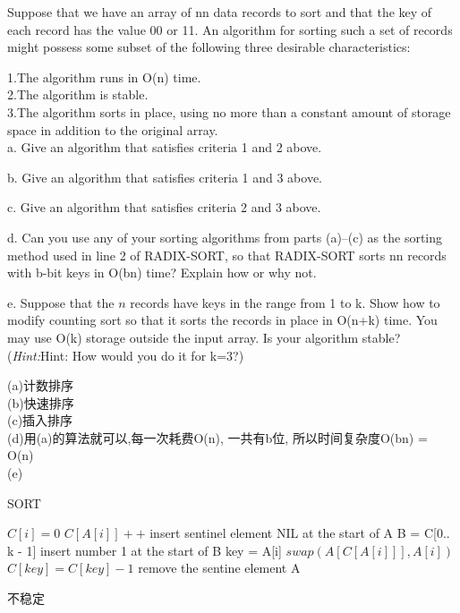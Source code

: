 \documentclass[a4paper, justified]{tufte-handout}
\begin{document}
\begin{problem}[TC Problem 8-2]
Suppose that we have an array of nn data records to sort and that the key of each record has the value 00 or 11. An algorithm for sorting such a set of records might possess some subset of the following three desirable characteristics:

1.The algorithm runs in O(n) time.\\
2.The algorithm is stable.\\
3.The algorithm sorts in place, using no more than a constant amount of storage space in addition to the original array.\\
a. Give an algorithm that satisfies criteria 1 and 2 above.

b. Give an algorithm that satisfies criteria 1 and 3 above.

c. Give an algorithm that satisfies criteria 2 and 3 above.

d. Can you use any of your sorting algorithms from parts (a)–(c) as the sorting method used in line 2 of RADIX-SORT, so that RADIX-SORT sorts nn records with b-bit keys in O(bn) time? Explain how or why not.

e. Suppose that the $n$ records have keys in the range from 1 to k. Show how to modify counting sort so that it sorts the records in place in O(n+k) time. You may use O(k) storage outside the input array. Is your algorithm stable? (\textit{Hint:}Hint: How would you do it for k=3?)
\end{problem}

\begin{solution}
  (a)计数排序\\
  (b)快速排序\\
  (c)插入排序\\
  (d)用(a)的算法就可以,每一次耗费O(n), 一共有b位, 所以时间复杂度O(bn) = O(n)\\
  (e)
  \begin{algorithm}[H]
    \caption{SORT}
    \label{counting_sorting}
    \begin{algorithmic}[1]
      \State $C[i] = 0$
      \EndFor
      \State $C[A[i]]++$
      \EndFor
      \State insert sentinel element NIL at the start of A
      \State B = C[0.. k - 1]
      \State insert number 1 at the start of B
      \State key = A[i]
      \State $swap(A[C[A[i]]], A[i])$
      \State $C[key] = C[key] - 1$
      \EndWhile
      \EndWhile
      \EndFor
      \State remove the sentine element
      \State \Return A
      \EndFunction
    \end{algorithmic}
  \end{algorithm}
  不稳定
\end{solution}
\end{document}

